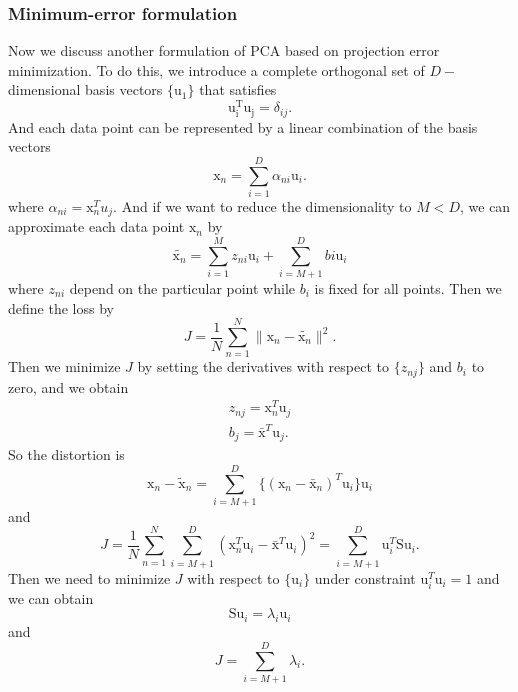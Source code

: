 \documentclass[a4paper]{book}
\newcommand{\mrm}{\mathrm}
\newcommand{\mx}{\mrm x}
\begin{document}
\subsubsection*{Minimum-error formulation}
Now we discuss another formulation of PCA based on projection error minimization. To do this, we introduce a complete orthogonal set of $D-$dimensional basis vectors $\{\mrm u_1\}$ that satisfies
\begin{equation}\label{}
  \mrm{u^T_iu_j} = \delta_{ij}.
\end{equation}
And each data point can be represented by a linear combination of the basis vectors
\begin{equation}\label{}
  \mx_n=\sum_{i=1}^{D}\alpha_{ni}\mrm u_i.
\end{equation}
where $\alpha_{ni} = \mx_n^Tu_j$. And if we want to reduce the dimensionality to $M<D$, we can approximate each data point $\mx_n$ by
\begin{equation}\label{}
  \tilde{\mx_n} = \sum_{i=1}^{M}z_{ni}\mrm u_i+\sum_{i=M+1}^{D}bi\mrm u_i
\end{equation}
where $z_{ni}$ depend on the particular point while $b_i$ is fixed for all points. Then we define the loss by
\begin{equation}\label{}
  J=\frac{1}{N}\sum_{n=1}^{N}\|\mx_n-\tilde{\mx_n}\|^2.
\end{equation}
Then we minimize $J$ by setting the derivatives with respect to $\{z_{nj}\}$ and $b_i$ to zero, and we obtain
\begin{gather}\label{}
  z_{nj} =  \mx_n^T\mrm u_j \\
  b_j = \bar{\mx}^T\mrm u_j.
\end{gather}
So the distortion is
\begin{equation}\label{}
  \mx_n-\tilde{\mx}_n = \sum_{i=M+1}^{D}\{(\mx_n-\bar{\mx}_n)^T\mrm u_i\}\mrm u_i
\end{equation}
and
\begin{equation}\label{}
  J = \frac{1}{N}\sum_{n=1}^{N}\sum_{i=M+1}^{D}(\mx_n^T\mrm u_i - \bar{\mx}^T\mrm u_i)^2=\sum_{i=M+1}^{D}\mrm u_i^T\mrm S\mrm u_i.
\end{equation}
Then we need to minimize $J$ with respect to $\{\mrm u_i\}$ under constraint $\mrm u_i^T\mrm u_i = 1$ and we can obtain
\begin{equation}\label{}
  \mrm S\mrm u_i = \lambda_i\mrm u_i
\end{equation}
and
\begin{equation}\label{}
  J = \sum_{i=M+1}^{D}\lambda_i.
\end{equation}
\end{document}
